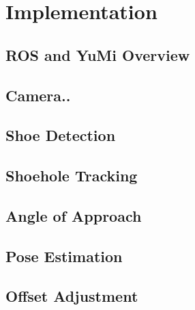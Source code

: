 \chapter{Implementation}

\section{ROS and YuMi Overview}

\section{Camera..}

\section{Shoe Detection}


\section{Shoehole Tracking}

\section{Angle of Approach}

\section{Pose Estimation}

\section{Offset Adjustment}

